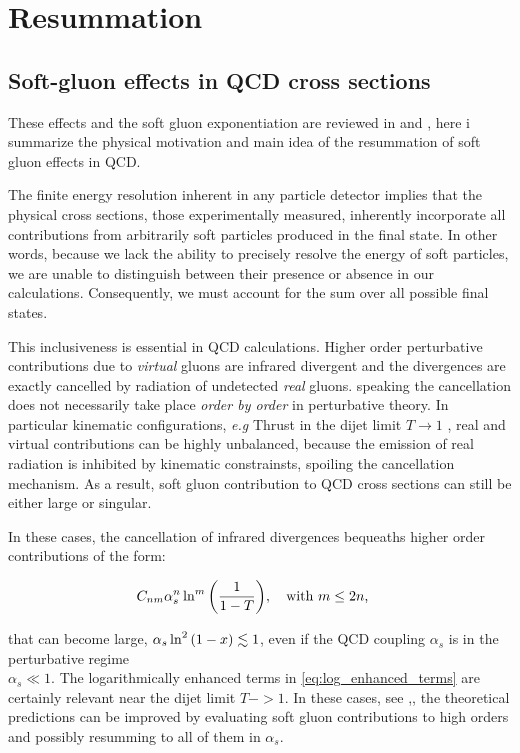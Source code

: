 \documentclass[../main.tex]{subfiles}
\begin{document}
\section{Resummation}


\subsection{Soft-gluon effects in QCD cross sections}

These effects and the soft gluon exponentiation are reviewed in \cite{Catani_1997} and \cite{catani1997softgluon}, here i summarize the physical 
motivation and main idea of the resummation of soft gluon effects in QCD.

The finite energy resolution inherent in any particle detector implies that the physical cross sections, 
those experimentally measured, inherently incorporate all contributions from arbitrarily soft particles 
produced in the final state. In other words, because we lack the ability to precisely resolve the energy 
of soft particles, we are unable to distinguish between their presence or absence in our calculations. 
Consequently, we must account for the sum over all possible final states.

This inclusiveness is essential in QCD calculations. Higher order perturbative contributions due to \emph{virtual}
gluons are infrared divergent and the divergences are exactly  cancelled by radiation of undetected \emph{real} gluons.
speaking the cancellation does not necessarily take place \emph{order by order} in perturbative theory.
In particular kinematic configurations, \emph{e.g} Thrust in the dijet limit $T \to 1$ ,   
real and virtual contributions can be highly unbalanced, because the emission of real radiation is inhibited by kinematic constrainsts,
spoiling the cancellation mechanism. As a result, soft gluon contribution to QCD cross sections can still be either large or singular.

In these cases, the cancellation of infrared divergences bequeaths higher order contributions of the form:

\begin{equation}\label{eq:log_enhanced_terms}
    C_{nm} \alpha_s^n \ln^m\qty(\frac{1}{1-T}) , \qq{with $m \le 2n $,}
\end{equation}

that can become large, $\alpha_s \ln^2\qty(1-x)\lesssim 1$, even if the QCD coupling $\alpha_s$ is in the perturbative regime \\
$\alpha_s \ll 1$.
The logarithmically enhanced terms in \cref{eq:log_enhanced_terms} are certainly relevant near the dijet limit $T->1$.
In these cases, see \cite{CATANI19933},\cite{CATANI1991491}, the theoretical predictions can be improved by evaluating soft gluon 
contributions to high orders and possibly resumming to all of them in $\alpha_s$.
\end{document}
